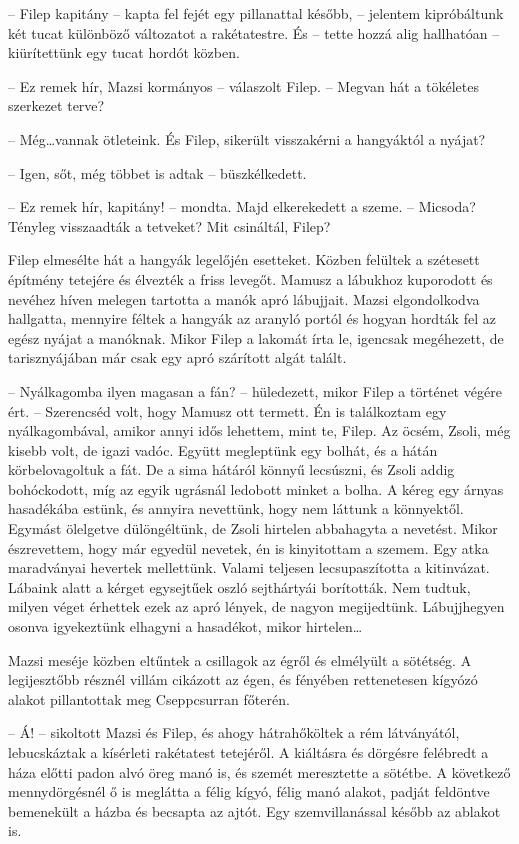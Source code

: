 \documentclass[10pt]{memoir}
\begin{document}
-- Filep kapitány -- kapta fel fejét egy pillanattal később, -- jelentem
kipróbáltunk két tucat különböző változatot a rakétatestre. És -- tette hozzá
alig hallhatóan -- kiürítettünk egy tucat hordót közben.

-- Ez remek hír, Mazsi kormányos -- válaszolt Filep. -- Megvan hát a
tökéletes szerkezet terve?

-- Még\dots vannak ötleteink. És Filep, sikerült visszakérni a hangyáktól a
nyájat?

-- Igen, sőt, még többet is adtak -- büszkélkedett.

-- Ez remek hír, kapitány! -- mondta. Majd elkerekedett a szeme. -- Micsoda?
Tényleg visszaadták a tetveket? Mit csináltál, Filep?

Filep elmesélte hát a hangyák legelőjén esetteket. Közben felültek a szétesett
építmény tetejére és élvezték a friss levegőt. Mamusz a lábukhoz kuporodott és
nevéhez híven melegen tartotta a manók apró lábujjait. Mazsi elgondolkodva
hallgatta, mennyire féltek a hangyák az aranyló portól és hogyan hordták fel az
egész nyájat a manóknak. Mikor Filep a lakomát írta le, igencsak megéhezett, de
tarisznyájában már csak egy apró szárított algát talált.

-- Nyálkagomba ilyen magasan a fán? -- hüledezett, mikor Filep a történet
végére ért. -- Szerencséd volt, hogy Mamusz ott termett. Én is találkoztam egy
nyálkagombával, amikor annyi idős lehettem, mint te, Filep. Az öcsém, Zsoli,
még kisebb volt, de igazi vadóc. Együtt megleptünk egy bolhát, és a hátán
körbelovagoltuk a fát. De a sima hátáról könnyű lecsúszni, és Zsoli addig
bohóckodott, míg az egyik ugrásnál ledobott minket a bolha. A kéreg egy árnyas
hasadékába estünk, és annyira nevettünk, hogy nem láttunk a könnyektől. Egymást
ölelgetve dülöngéltünk, de Zsoli hirtelen abbahagyta a nevetést. Mikor
észrevettem, hogy már egyedül nevetek, én is kinyitottam a szemem. Egy atka
maradványai hevertek mellettünk. Valami teljesen lecsupaszította a kitinvázat.
Lábaink alatt a kérget egysejtűek oszló sejthártyái borították. Nem tudtuk,
milyen véget érhettek ezek az apró lények, de nagyon megijedtünk. Lábujjhegyen
osonva igyekeztünk elhagyni a hasadékot, mikor hirtelen\dots

Mazsi meséje közben eltűntek a csillagok az égről és elmélyült a sötétség. A
legijesztőbb résznél villám cikázott az égen, és fényében rettenetesen kígyózó
alakot pillantottak meg Cseppcsurran főterén.

-- Á! -- sikoltott Mazsi és Filep, és ahogy hátrahőköltek a rém látványától,
lebucskáztak a kísérleti rakétatest tetejéről. A kiáltásra és dörgésre
felébredt a háza előtti padon alvó öreg manó is, és szemét meresztette a
sötétbe. A következő mennydörgésnél ő is meglátta a félig kígyó, félig manó
alakot, padját feldöntve bemenekült a házba és becsapta az ajtót. Egy
szemvillanással később az ablakot is.
\end{document}
